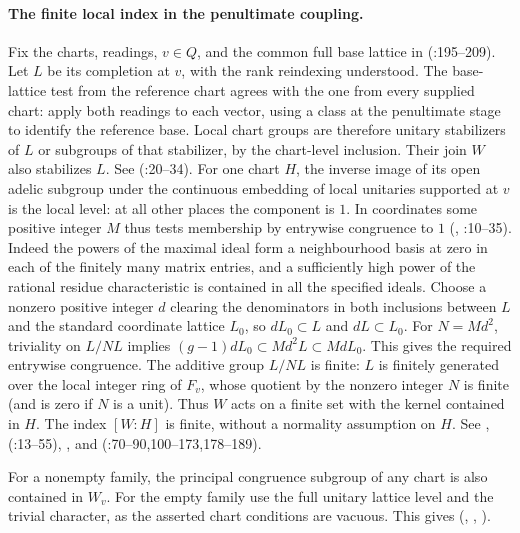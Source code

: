 \paragraph{The finite local index in the penultimate coupling.}
Fix the charts, readings, $v\in Q$, and the common full base lattice
in 
(:195--209).
Let $L$ be its completion at $v$, with the rank reindexing understood.
The base-lattice test from the reference chart agrees with the one
from every supplied chart: apply both readings to each vector, using a
class at the penultimate stage to identify the reference base.
Local chart groups are therefore unitary stabilizers of $L$ or subgroups
of that stabilizer, by the chart-level inclusion. Their join $W$ also
stabilizes $L$. See 
(:20--34).
For one chart $H$, the inverse image of its open adelic subgroup under
the continuous embedding of local unitaries supported at $v$ is the local
level: at all other places the component is $1$. In coordinates some
positive integer $M$ thus tests membership by entrywise congruence
to $1$ (, :10--35).
Indeed the powers of the maximal ideal form a neighbourhood basis at zero
in each of the finitely many matrix entries, and a sufficiently high
power of the rational residue characteristic is contained in all the
specified ideals.
Choose a nonzero positive integer $d$ clearing the denominators in
both inclusions between $L$ and the standard coordinate lattice $L_0$,
so $dL_0\subset L$ and $dL\subset L_0$. For $N=Md^2$, triviality
on $L/NL$ implies $(g-1)dL_0\subset Md^2L\subset MdL_0$.
This gives the required entrywise congruence. The additive group $L/NL$
is finite: $L$ is finitely generated over the local integer ring of
$F_v$, whose quotient by the nonzero integer $N$ is finite (and is
zero if $N$ is a unit). Thus $W$ acts on a finite set with the
kernel contained in $H$. The index $[W:H]$ is finite, without a
normality assumption on $H$. See ,
 (:13--55),
,  and
 (:70--90,100--173,178--189).

For a nonempty family, the principal congruence subgroup of any chart is also contained in $W_v$.
For the empty family use the full unitary lattice level and the trivial
character, as the asserted chart conditions are vacuous. This gives
(,
,
).


